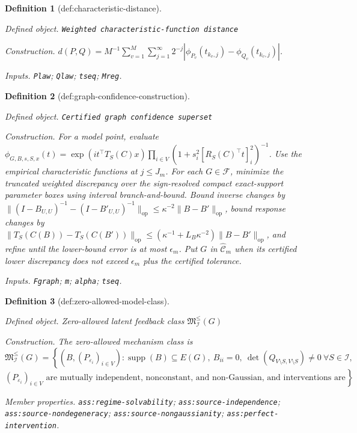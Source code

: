 \documentclass{article}
\newtheorem{definition}{Definition}
\begin{document}
\begin{definition}[def:characteristic-distance]\label{def:characteristic-distance}
\par\smallskip\noindent\emph{Defined object.} \texttt{Weighted characteristic-\allowbreak{}function distance}
\par\smallskip\noindent\emph{Construction.} \(d(P,Q)=M^{-1}\sum_{v=1}^M\sum_{j=1}^{\infty}2^{-j}|\phi_{P_v}(t_{k_v,j})-\phi_{Q_v}(t_{k_v,j})|\).
\par\smallskip\noindent\emph{Inputs.} \texttt{Plaw}; \texttt{Qlaw}; \texttt{tseq}; \texttt{Mreg}.
\end{definition}

\begin{definition}[def:graph-confidence-construction]\label{def:graph-confidence-construction}
\par\smallskip\noindent\emph{Defined object.} \texttt{Certified graph confidence superset}
\par\smallskip\noindent\emph{Construction.} For a model point, evaluate \(\phi_{G,B,s,S,x}(t)=\exp(i t^\top T_S(C)x)\prod_{i\in V}(1+s_i^2[R_S(C)^\top t]_i^2)^{-1}\). Use the empirical characteristic functions at \(j\le J_m\). For each \(G\in\mathcal F\), minimize the truncated weighted discrepancy over the sign-resolved compact exact-support parameter boxes using interval branch-and-bound. Bound inverse changes by \(\|(I-B_{U,U})^{-1}-(I-B'_{U,U})^{-1}\|_{\mathrm{op}}\le\kappa^{-2}\|B-B'\|_{\mathrm{op}}\), bound response changes by \(\|T_S(C(B))-T_S(C(B'))\|_{\mathrm{op}}\le(\kappa^{-1}+L_B\kappa^{-2})\|B-B'\|_{\mathrm{op}}\), and refine until the lower-bound error is at most \(\epsilon_m\). Put \(G\) in \(\widehat{\mathcal C}_m\) when its certified lower discrepancy does not exceed \(\epsilon_m\) plus the certified tolerance.
\par\smallskip\noindent\emph{Inputs.} \texttt{Fgraph}; \texttt{m}; \texttt{alpha}; \texttt{tseq}.
\end{definition}

\begin{definition}[def:zero-allowed-model-class]\label{def:zero-allowed-model-class}
\par\smallskip\noindent\emph{Defined object.} Zero-allowed latent feedback class \(\mathfrak M^{\le}_{\mathcal I}(G)\)
\par\smallskip\noindent\emph{Construction.} The zero-allowed mechanism class is
\[
\mathfrak M^{\le}_{\mathcal I}(G)=\left\{(B,(P_{\varepsilon_i})_{i\in V}):\operatorname{supp}(B)\subseteq E(G),\ B_{ii}=0,\ \det(Q_{V\setminus S,V\setminus S})\ne0\ \forall S\in\mathcal I,
\right.\]
\[
\left.(P_{\varepsilon_i})_{i\in V}\text{ are mutually independent, nonconstant, and non-Gaussian, and interventions are surgical}\right\}.
\]
\par\smallskip\noindent\emph{Member properties.} \texttt{ass:\allowbreak{}regime-\allowbreak{}solvability}; \texttt{ass:\allowbreak{}source-\allowbreak{}independence}; \texttt{ass:\allowbreak{}source-\allowbreak{}nondegeneracy}; \texttt{ass:\allowbreak{}source-\allowbreak{}nongaussianity}; \texttt{ass:\allowbreak{}perfect-\allowbreak{}intervention}.
\end{definition}
\end{document}
